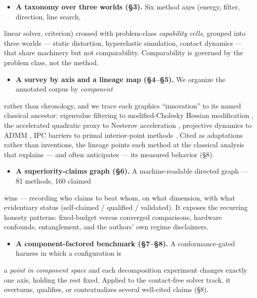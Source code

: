 \documentclass{egpubl}
\begin{document}
\begin{itemize}
  \item \textbf{A taxonomy over three worlds (\S3).} Six method axes (energy, filter, direction, line search,
\end{itemize}
  linear solver, criterion) crossed with problem-class \emph{capability cells}, grouped into three worlds
  --- static distortion, hyperelastic simulation, contact dynamics --- that share machinery but not
  comparability. Comparability is governed by the problem class, not the method.

\begin{itemize}
  \item \textbf{A survey by axis and a lineage map (\S4--\S5).} We organize the annotated corpus by \emph{component}
\end{itemize}
  rather than chronology, and we trace each graphics ``innovation'' to its named classical ancestor:
  eigenvalue filtering to modified-Cholesky Hessian modification \cite{gill-murray-1974}, the accelerated quadratic proxy to
  Nesterov acceleration \cite{nesterov-1983}, projective dynamics to ADMM \cite{boyd-2011-admm}, IPC \cite{ipc} barriers to primal interior-point methods \cite{fiacco-mccormick-1968}.
  Cited as adaptations rather than inventions, the lineage points each method at the classical analysis
  that explains --- and often anticipates --- its measured behavior (\S8).

\begin{itemize}
  \item \textbf{A superiority-claims graph (\S6).} A machine-readable directed graph --- 81 methods, 160 claimed
\end{itemize}
  wins --- recording who claims to beat whom, on what dimension, with what evidentiary status
  (self-claimed / qualified / validated). It exposes the recurring honesty patterns: fixed-budget
  versus converged comparisons, hardware confounds, entanglement, and the authors' own regime
  disclaimers.

\begin{itemize}
  \item \textbf{A component-factored benchmark (\S7--\S8).} A conformance-gated harness in which a configuration is
\end{itemize}
  a \emph{point in component space} and each decomposition experiment changes exactly one axis, holding the
  rest fixed. Applied to the contact-free solver track, it overturns, qualifies, or contextualizes
  several well-cited claims (\S8).
\end{document}
